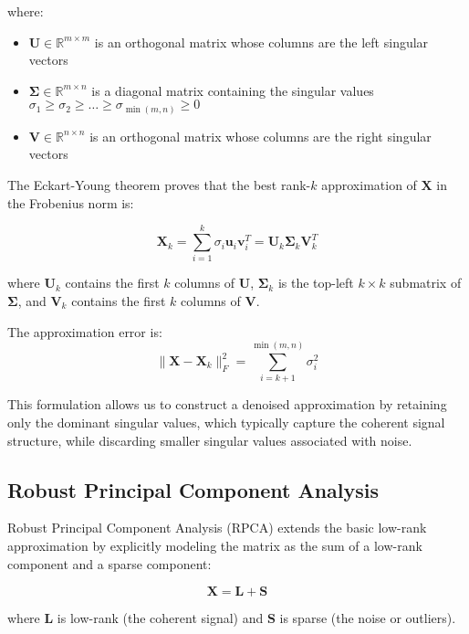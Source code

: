 \documentclass[11pt]{article}
\begin{document}
where:
\begin{itemize}
\item $\mathbf{U} \in \mathbb{R}^{m \times m}$ is an orthogonal matrix whose columns are the left singular vectors
\item $\mathbf{\Sigma} \in \mathbb{R}^{m \times n}$ is a diagonal matrix containing the singular values $\sigma_1 \geq \sigma_2 \geq \ldots \geq \sigma_{\min(m,n)} \geq 0$
\item $\mathbf{V} \in \mathbb{R}^{n \times n}$ is an orthogonal matrix whose columns are the right singular vectors
\end{itemize}

The Eckart-Young theorem proves that the best rank-$k$ approximation of $\mathbf{X}$ in the Frobenius norm is:

\begin{equation}
\mathbf{X}_k = \sum_{i=1}^{k} \sigma_i \mathbf{u}_i \mathbf{v}_i^T = \mathbf{U}_k \mathbf{\Sigma}_k \mathbf{V}_k^T
\end{equation}

where $\mathbf{U}_k$ contains the first $k$ columns of $\mathbf{U}$, $\mathbf{\Sigma}_k$ is the top-left $k \times k$ submatrix of $\mathbf{\Sigma}$, and $\mathbf{V}_k$ contains the first $k$ columns of $\mathbf{V}$.

The approximation error is:
\begin{equation}
\|\mathbf{X} - \mathbf{X}_k\|_F^2 = \sum_{i=k+1}^{\min(m,n)} \sigma_i^2
\end{equation}

This formulation allows us to construct a denoised approximation by retaining only the dominant singular values, which typically capture the coherent signal structure, while discarding smaller singular values associated with noise.

\subsection{Robust Principal Component Analysis}
Robust Principal Component Analysis (RPCA) extends the basic low-rank approximation by explicitly modeling the matrix as the sum of a low-rank component and a sparse component:

\begin{equation}
\mathbf{X} = \mathbf{L} + \mathbf{S}
\end{equation}

where $\mathbf{L}$ is low-rank (the coherent signal) and $\mathbf{S}$ is sparse (the noise or outliers).
\end{document}
